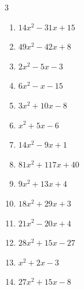 \begin{multicols}{3}
\begin{enumerate}
        \phantom{$=(6x+1)(3x-5)$}

  \item $14x^{2}-31x+15$

        \phantom{$=(2x-3)(7x-5)$}

  \item $49x^{2}-42x+8$

        \phantom{$=(7x-2)(7x-4)$}

\columnbreak %

  \item $2x^{2}-5x-3$

        \phantom{$=(x-3)(2x+1)$}

  \item $6x^{2}-x-15$

        \phantom{$=(2x+3)(3x-5)$}

  \item $3x^{2}+10x-8$

        \phantom{$=(x+4)(3x-2)$}

  \item $x^{2}+5x-6$

        \phantom{$=(x-1)(x+6)$}

  \item $14x^{2}-9x+1$

        \phantom{$=(7x-1)(2x-1)$}

  \item $81x^{2}+117x+40$

        \phantom{$=(9x+8)(9x+5)$}

  \item $9x^{2}+13x+4$

        \phantom{$=(x+1)(9x+4)$}

  \item $18x^{2}+29x+3$

        \phantom{$=(2x+3)(9x+1)$}

  \item $21x^{2}-20x+4$

        \phantom{$=(7x-2)(3x-2)$}

  \item $28x^{2}+15x-27$

        \phantom{$=(7x+9)(4x-3)$}

\columnbreak %

  \item $x^{2}+2x-3$

        \phantom{$=(x-1)(x+3)$}

  \item $27x^{2}+15x-8$


\end{enumerate}
\end{multicols}
